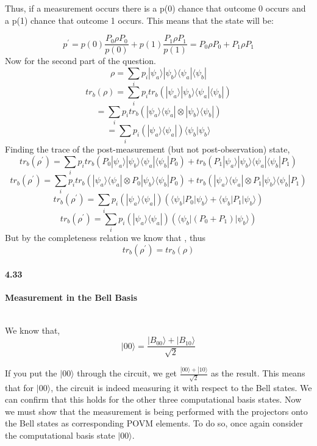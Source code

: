  



Thus, if a measurement occurs there is a p(0) chance that outcome 0 occurs and a p(1) chance that outcome 1 occurs. This means that the state will be:


$$p^\prime = p(0)\frac{P_0 \rho P_0}{p(0)} + p(1)\frac{P_1 \rho P_1}{p(1)} = P_0 \rho P_0 + P_1 \rho P_1$$
Now for the second part of the question.
$$\rho = \sum_{i} p_i |\psi_a\rangle |\psi_b\rangle \langle \psi_a |   \langle \psi_b| $$
$$tr_b(\rho) = \sum_{i} p_i tr_b(|\psi_a\rangle |\psi_b\rangle \langle \psi_a |   \langle \psi_b|) $$
$$= \sum_{i} p_i tr_b(|\psi_a\rangle \langle \psi_a | \otimes |\psi_b\rangle \langle \psi_b|) $$$$ = \sum_{i} p_i (|\psi_a\rangle \langle \psi_a |) \langle \psi_b|\psi_b\rangle $$
Finding the trace of the post-measurement (but not post-observation) state,  
$$tr_{b}(\rho^\prime) = \sum_{i} p_i tr_b(P_0|\psi_a\rangle |\psi_b\rangle \langle \psi_a |   \langle \psi_b|P_0) + tr_b(P_1|\psi_a\rangle |\psi_b\rangle \langle \psi_a |   \langle \psi_b|P_1) $$$$tr_{b}(\rho^\prime) = \sum_{i} p_i tr_b(|\psi_a\rangle  \langle \psi_a | \otimes P_0|\psi_b\rangle   \langle \psi_b|P_0) + tr_b(|\psi_a\rangle \langle \psi_a | \otimes P_1|\psi_b\rangle  \langle \psi_b|P_1) $$
$$tr_{b}(\rho^\prime) = \sum_{i} p_i (|\psi_a\rangle  \langle \psi_a |)( \langle \psi_b|P_0|\psi_b\rangle   +\langle \psi_b|P_1|\psi_b\rangle)  $$
$$tr_{b}(\rho^\prime) = \sum_{i} p_i (|\psi_a\rangle  \langle \psi_a |)( \langle \psi_b|(P_0 + P_1)|\psi_b\rangle)  $$
But by the completeness relation we know that   , thus $$tr_b(\rho^\prime) = tr_b(\rho)$$

\paragraph{4.33} \textbf{Measurement in the Bell Basis}

\\

We know that,
$$|00\rangle = \frac{|B_{00}\rangle + |B_{10}\rangle}{\sqrt{2}}$$


If you put the $|00\rangle$ through the circuit, we get $\frac{|00\rangle + |10\rangle}{\sqrt{2}}$ as the result. This means that for $|00\rangle$, the circuit is indeed measuring it with respect to the Bell states. We can confirm that this holds for the other three computational basis states. Now we must show that the measurement is being performed with the projectors onto the Bell states as corresponding POVM elements. To do so, once again consider the computational basis state $|00\rangle$.


